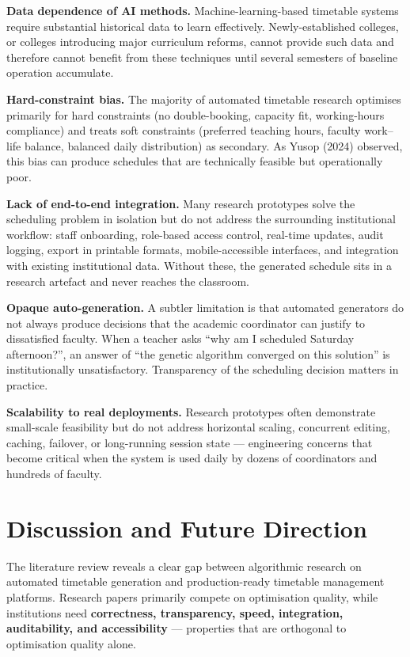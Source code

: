 \textbf{Data dependence of AI methods.} Machine-learning-based timetable systems require substantial historical data to learn effectively. Newly-established colleges, or colleges introducing major curriculum reforms, cannot provide such data and therefore cannot benefit from these techniques until several semesters of baseline operation accumulate.

\textbf{Hard-constraint bias.} The majority of automated timetable research optimises primarily for hard constraints (no double-booking, capacity fit, working-hours compliance) and treats soft constraints (preferred teaching hours, faculty work--life balance, balanced daily distribution) as secondary. As Yusop (2024) observed, this bias can produce schedules that are technically feasible but operationally poor.

\textbf{Lack of end-to-end integration.} Many research prototypes solve the scheduling problem in isolation but do not address the surrounding institutional workflow: staff onboarding, role-based access control, real-time updates, audit logging, export in printable formats, mobile-accessible interfaces, and integration with existing institutional data. Without these, the generated schedule sits in a research artefact and never reaches the classroom.

\textbf{Opaque auto-generation.} A subtler limitation is that automated generators do not always produce decisions that the academic coordinator can justify to dissatisfied faculty. When a teacher asks ``why am I scheduled Saturday afternoon?'', an answer of ``the genetic algorithm converged on this solution'' is institutionally unsatisfactory. Transparency of the scheduling decision matters in practice.

\textbf{Scalability to real deployments.} Research prototypes often demonstrate small-scale feasibility but do not address horizontal scaling, concurrent editing, caching, failover, or long-running session state --- engineering concerns that become critical when the system is used daily by dozens of coordinators and hundreds of faculty.

\section{Discussion and Future Direction}

The literature review reveals a clear gap between algorithmic research on automated timetable generation and production-ready timetable management platforms. Research papers primarily compete on optimisation quality, while institutions need \textbf{correctness, transparency, speed, integration, auditability, and accessibility} --- properties that are orthogonal to optimisation quality alone.

